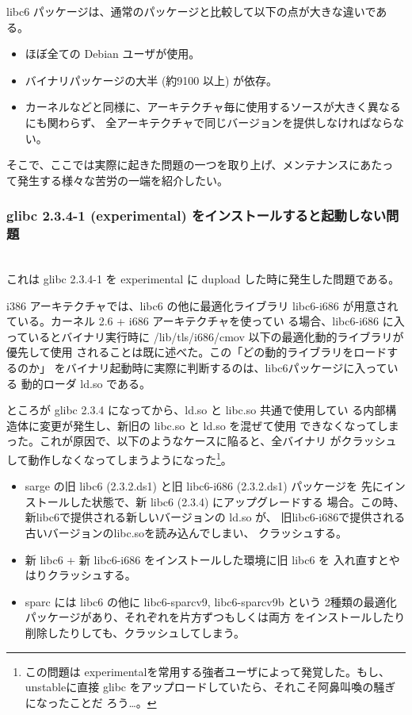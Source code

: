 \documentclass[mingoth,a4paper]{jsarticle}
\newcommand{\subsubsubsection}[1]{%
\vspace{1zw}{\bf #1}\\}
\begin{document}
  libc6 パッケージは、通常のパッケージと比較して以下の点が大きな違いである。

	\begin{itemize}
	  \item ほぼ全ての Debian ユーザが使用。
	  \item バイナリパッケージの大半 (約9100 以上)
	        が依存。
	  \item カーネルなどと同様に、アーキテクチャ毎に使用するソースが大きく異なるにも関わらず、
	        全アーキテクチャで同じバージョンを提供しなければならない。
	\end{itemize}

  そこで、ここでは実際に起きた問題の一つを取り上げ、メンテナンスにあたっ
  て発生する様々な苦労の一端を紹介したい。

  \subsubsection{glibc 2.3.4-1 (experimental) をインストールすると起動しない問題}
   \subsubsubsection{発生した問題}

    これは glibc 2.3.4-1 を experimental に dupload した時に発生した問題である。

    i386 アーキテクチャでは、libc6 の他に最適化ライブラリ libc6-i686 
    が用意されている。カーネル 2.6 + i686 アーキテクチャを使ってい
    る場合、libc6-i686 に入っているとバイナリ実行時に
    /lib/tls/i686/cmov 以下の最適化動的ライブラリが優先して使用
    されることは既に述べた。この「どの動的ライブラリをロードするのか」
    をバイナリ起動時に実際に判断するのは、libc6パッケージに入っている
    動的ローダ ld.so である。

    ところが glibc 2.3.4 になってから、ld.so と libc.so 共通で使用してい
    る内部構造体に変更が発生し、新旧の libc.so と ld.so を混ぜて使用
    できなくなってしまった。これが原因で、以下のようなケースに陥ると、全バイナリ
    がクラッシュして動作しなくなってしまうようになった\footnote{この問題は
    experimentalを常用する強者ユーザによって発覚した。もし、unstableに直接
    glibc をアップロードしていたら、それこそ阿鼻叫喚の騒ぎになったことだ
    ろう…。}。

    \begin{itemize}
     \item sarge の旧 libc6 (2.3.2.ds1) と旧 libc6-i686 (2.3.2.ds1) パッケージを
       先にインストールした状態で、新 libc6 (2.3.4) にアップグレードする
	   場合。この時、新libc6で提供される新しいバージョンの ld.so が、
	   旧libc6-i686で提供される古いバージョンのlibc.soを読み込んでしまい、
	   クラッシュする。
     \item 新 libc6 + 新 libc6-i686 をインストールした環境に旧 libc6 を
	   入れ直すとやはりクラッシュする。
     \item sparc には libc6 の他に libc6-sparcv9, libc6-sparcv9b という
	   2種類の最適化パッケージがあり、それぞれを片方ずつもしくは両方
	   をインストールしたり削除したりしても、クラッシュしてしまう。
    \end{itemize}
\end{document}
